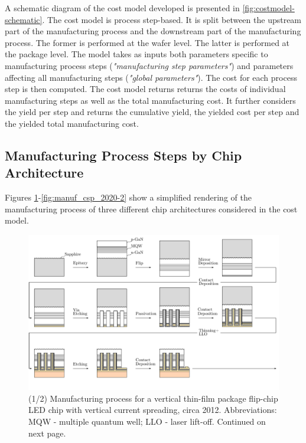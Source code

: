 \documentclass[10pt]{article}
\begin{document}
A schematic diagram of the cost model developed is presented in  \cref{fig:costmodel-schematic}. The cost model is process step-based. It is split between the upstream part of the manufacturing process and the downstream part of the manufacturing process. The former is performed at the wafer level. The latter is performed at the package level. The model takes as inputs both parameters specific to manufacturing process steps (\textit{"manufacturing step parameters"}) and parameters affecting all manufacturing steps (\textit{"global parameters"}). The cost for each process step is then computed. The cost model returns returns the costs of individual manufacturing steps as well as the total manufacturing cost. It further considers the yield per step and returns the cumulative yield, the yielded cost per step and the yielded total manufacturing cost.

\subsection{Manufacturing Process Steps by Chip Architecture}

Figures \cref{fig:manuf_vtf_2012-1}-\cref{fig:manuf_csp_2020-2} show a simplified rendering of the manufacturing process of three different chip architectures considered in the cost model.


    \begin{landscape}
        \begin{figure}
            \includegraphics[width=595pt]{./figures/vtf_overview_2012-1.pdf}
            \caption{(1/2) Manufacturing process for a vertical thin-film  package flip-chip LED chip with vertical current spreading, circa 2012. Abbreviations: MQW - multiple quantum well; LLO - laser lift-off. Continued on next page.}
            \label{fig:manuf_vtf_2012-1}
        \end{figure}
    \end{landscape}
\end{document}
